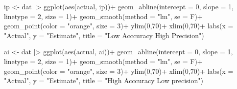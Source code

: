 \documentclass[
  letterpaper,
  DIV=11,
  numbers=noendperiod]{scrreprt}
\newenvironment{Shaded}{\begin{snugshade}}{\end{snugshade}}
\newcommand{\AttributeTok}[1]{\textcolor[rgb]{0.40,0.45,0.13}{#1}}
\newcommand{\DecValTok}[1]{\textcolor[rgb]{0.68,0.00,0.00}{#1}}
\newcommand{\FunctionTok}[1]{\textcolor[rgb]{0.28,0.35,0.67}{#1}}
\newcommand{\NormalTok}[1]{\textcolor[rgb]{0.00,0.23,0.31}{#1}}
\newcommand{\OtherTok}[1]{\textcolor[rgb]{0.00,0.23,0.31}{#1}}
\newcommand{\SpecialCharTok}[1]{\textcolor[rgb]{0.37,0.37,0.37}{#1}}
\newcommand{\StringTok}[1]{\textcolor[rgb]{0.13,0.47,0.30}{#1}}
\begin{document}
\begin{Shaded}
\begin{Highlighting}[]
\NormalTok{ip }\OtherTok{\textless{}{-}}\NormalTok{ dat }\SpecialCharTok{|\textgreater{}} 
  \FunctionTok{ggplot}\NormalTok{(}\FunctionTok{aes}\NormalTok{(actual, ip))}\SpecialCharTok{+}
  \FunctionTok{geom\_abline}\NormalTok{(}\AttributeTok{intercept =} \DecValTok{0}\NormalTok{, }\AttributeTok{slope =} \DecValTok{1}\NormalTok{, }
              \AttributeTok{linetype =} \DecValTok{2}\NormalTok{, }\AttributeTok{size =} \DecValTok{1}\NormalTok{)}\SpecialCharTok{+}
  \FunctionTok{geom\_smooth}\NormalTok{(}\AttributeTok{method =} \StringTok{"lm"}\NormalTok{, }\AttributeTok{se =}\NormalTok{ F)}\SpecialCharTok{+}
  \FunctionTok{geom\_point}\NormalTok{(}\AttributeTok{color =} \StringTok{"orange"}\NormalTok{, }\AttributeTok{size =} \DecValTok{3}\NormalTok{)}\SpecialCharTok{+}
  \FunctionTok{ylim}\NormalTok{(}\DecValTok{0}\NormalTok{,}\DecValTok{70}\NormalTok{)}\SpecialCharTok{+}
  \FunctionTok{xlim}\NormalTok{(}\DecValTok{0}\NormalTok{,}\DecValTok{70}\NormalTok{)}\SpecialCharTok{+}
  \FunctionTok{labs}\NormalTok{(}\AttributeTok{x =} \StringTok{"Actual"}\NormalTok{, }\AttributeTok{y =} \StringTok{"Estimate"}\NormalTok{,}
       \AttributeTok{title =} \StringTok{"Low Acccuracy High Precision"}\NormalTok{)}

\NormalTok{ai }\OtherTok{\textless{}{-}}\NormalTok{ dat }\SpecialCharTok{|\textgreater{}} 
  \FunctionTok{ggplot}\NormalTok{(}\FunctionTok{aes}\NormalTok{(actual, ai))}\SpecialCharTok{+}
  \FunctionTok{geom\_abline}\NormalTok{(}\AttributeTok{intercept =} \DecValTok{0}\NormalTok{, }\AttributeTok{slope =} \DecValTok{1}\NormalTok{, }
              \AttributeTok{linetype =} \DecValTok{2}\NormalTok{, }\AttributeTok{size =} \DecValTok{1}\NormalTok{)}\SpecialCharTok{+}
  \FunctionTok{geom\_smooth}\NormalTok{(}\AttributeTok{method =} \StringTok{"lm"}\NormalTok{, }\AttributeTok{se =}\NormalTok{ F)}\SpecialCharTok{+}
  \FunctionTok{geom\_point}\NormalTok{(}\AttributeTok{color =} \StringTok{"orange"}\NormalTok{, }\AttributeTok{size =} \DecValTok{3}\NormalTok{)}\SpecialCharTok{+}
  \FunctionTok{ylim}\NormalTok{(}\DecValTok{0}\NormalTok{,}\DecValTok{70}\NormalTok{)}\SpecialCharTok{+}
  \FunctionTok{xlim}\NormalTok{(}\DecValTok{0}\NormalTok{,}\DecValTok{70}\NormalTok{)}\SpecialCharTok{+}
  \FunctionTok{labs}\NormalTok{(}\AttributeTok{x =} \StringTok{"Actual"}\NormalTok{, }\AttributeTok{y =} \StringTok{"Estimate"}\NormalTok{,}
       \AttributeTok{title =} \StringTok{"High Acccuracy Low precision"}\NormalTok{)}


\end{Highlighting}
\end{Shaded}
\end{document}
